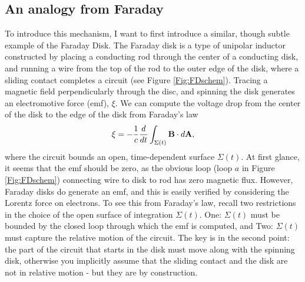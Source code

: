 \subsection{An analogy from Faraday}
To introduce this mechanism, I want to first introduce a similar, though
subtle example of the Faraday Disk. The Faraday disk is a type of unipolar
inductor constructed by placing a conducting rod through the center of a
conducting disk, and running a wire from the top of the rod to the outer edge
of the disk, where a sliding contact completes a circuit (see Figure
\ref{Fig:FDschem}). Tracing a magnetic field perpendicularly through the disc,
and spinning the disk generates an electromotive force (emf), $\xi$. We can compute
the voltage drop from the center of the disk to the edge of the disk from
Faraday's law
\begin{align} 
\xi = - \frac{1}{c}\frac{d}{dt}\int_{\Sigma(t)}{{\bf B} \cdot d{\bf A}}, 
\end{align} 
where the circuit bounds an open, time-dependent surface $\Sigma(t)$. At first
glance, it seems that the emf should be zero, as the obvious loop (loop $a$ in
Figure \ref{Fig:FDschem}) connecting wire to disk to rod has zero magnetic
flux. However, Faraday disks do generate an emf, and this is easily verified
by considering the Lorentz force on electrons. To see this from Faraday's law, recall two restrictions in the
choice of the open surface of integration $\Sigma(t)$. One: $\Sigma(t)$ must be bounded by the closed loop through which the emf is computed, and Two: $\Sigma(t)$ must capture the relative motion of the circuit.
The key is in the second point: the part of the circuit that starts in the
disk must move along with the spinning disk, otherwise you implicitly assume
that the sliding contact and the disk are not in relative motion - but they
are by construction.


